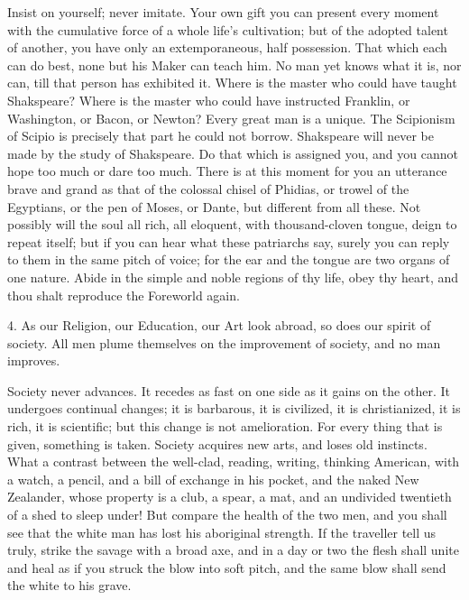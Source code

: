 \documentclass[12pt]{article}
\begin{document}
Insist on yourself; never imitate. Your own gift you can present every
moment with the cumulative force of a whole life's cultivation; but of the
adopted talent of another, you have only an extemporaneous, half possession.
That which each can do best, none but his Maker can teach him. No man yet
knows what it is, nor can, till that person has exhibited it. Where is the
master who could have taught Shakspeare? Where is the master who could have
instructed Franklin, or Washington, or Bacon, or Newton? Every great man is
a unique. The Scipionism of Scipio is precisely that part he could not
borrow. Shakspeare will never be made by the study of Shakspeare. Do that
which is assigned you, and you cannot hope too much or dare too much. There
is at this moment for you an utterance brave and grand as that of the
colossal chisel of Phidias, or trowel of the Egyptians, or the pen of Moses,
or Dante, but different from all these. Not possibly will the soul all rich,
all eloquent, with thousand-cloven tongue, deign to repeat itself; but if
you can hear what these patriarchs say, surely you can reply to them in the
same pitch of voice; for the ear and the tongue are two organs of one
nature. Abide in the simple and noble regions of thy life, obey thy heart,
and thou shalt reproduce the Foreworld again.

4. As our Religion, our Education, our Art look abroad, so does our spirit
of society. All men plume themselves on the improvement of society, and no
man improves.

Society never advances. It recedes as fast on one side as it gains on the
other. It undergoes continual changes; it is barbarous, it is civilized, it
is christianized, it is rich, it is scientific; but this change is not
amelioration. For every thing that is given, something is taken. Society
acquires new arts, and loses old instincts. What a contrast between the
well-clad, reading, writing, thinking American, with a watch, a pencil, and
a bill of exchange in his pocket, and the naked New Zealander, whose
property is a club, a spear, a mat, and an undivided twentieth of a shed to
sleep under! But compare the health of the two men, and you shall see that
the white man has lost his aboriginal strength. If the traveller tell us
truly, strike the savage with a broad axe, and in a day or two the flesh
shall unite and heal as if you struck the blow into soft pitch, and the same
blow shall send the white to his grave.
\end{document}
